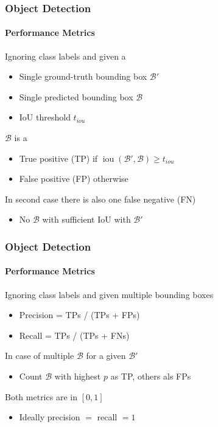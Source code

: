 \documentclass[xetex,professionalfont]{beamer}
\renewcommand\emph[1]{\textcolor{tuwcvl_cvl_blue}{#1}}
\newcommand{\cB}{\mathcal{B}}
\DeclareMathOperator*{\iou}{iou}
\begin{document}
\begin{frame}
	\frametitle{Object Detection}
	\framesubtitle{Performance Metrics}

	Ignoring class labels and given a
	\begin{itemize}
		\item Single ground-truth bounding box $\cB'$
		\item Single predicted bounding box $\cB$
		\item IoU threshold $t_{iou}$
	\end{itemize}

	\bigskip

	$\cB$ is a
	\begin{itemize}
		\item \emph{True positive} (\emph{TP}) if $\iou(\cB',\cB)\geq t_{iou}$
		\item \emph{False positive} (\emph{FP}) otherwise
	\end{itemize}

	\bigskip

	In second case there is also one \emph{false negative} (\emph{FN})
	\begin{itemize}
		\item No $\cB$ with sufficient IoU with $\cB'$
	\end{itemize}

\end{frame}


\begin{frame}
	\frametitle{Object Detection}
	\framesubtitle{Performance Metrics}

	Ignoring class labels and given multiple bounding boxes
	\begin{itemize}
		\item \emph{Precision} = TPs / (TPs + FPs)
		\item \emph{Recall} = TPs / (TPs + FNs)
	\end{itemize}

	\bigskip

	In case of multiple $\cB$ for a given $\cB'$ %
	\begin{itemize}
		\item Count $\cB$ with highest $p$ as TP, others als FPs
	\end{itemize}

	\bigskip

	Both metrics are in $[0,1]$
	\begin{itemize}
		\item Ideally precision $=$ recall $=1$
	\end{itemize}

\end{frame}
\end{document}
